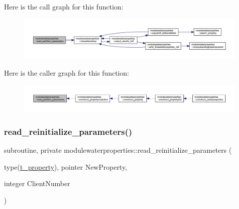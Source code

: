 Here is the call graph for this function\+:\nopagebreak
\begin{figure}[H]
\begin{center}
\leavevmode
\includegraphics[width=350pt]{namespacemodulewaterproperties_ac511e23eb2975f0a46fef2973712f060_cgraph}
\end{center}
\end{figure}
Here is the caller graph for this function\+:\nopagebreak
\begin{figure}[H]
\begin{center}
\leavevmode
\includegraphics[width=350pt]{namespacemodulewaterproperties_ac511e23eb2975f0a46fef2973712f060_icgraph}
\end{center}
\end{figure}
\mbox{\label{namespacemodulewaterproperties_adb847af3f3968c2d9bf627677cb37d95}} 
\subsubsection{\texorpdfstring{read\+\_\+reinitialize\+\_\+parameters()}{read\_reinitialize\_parameters()}}
{\footnotesize\ttfamily subroutine, private modulewaterproperties\+::read\+\_\+reinitialize\+\_\+parameters (\begin{DoxyParamCaption}\item[{type(\mbox{\hyperlink{structmodulewaterproperties_1_1t__property}{t\+\_\+property}}), pointer}]{New\+Property,  }\item[{integer}]{Client\+Number }\end{DoxyParamCaption})\hspace{0.3cm}{\ttfamily [private]}}

